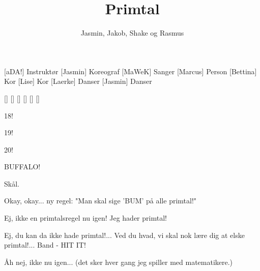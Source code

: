 \documentclass[a4paper,11pt]{article}
\title{Primtal}
\author{Jasmin, Jakob, Shake og Rasmus}
\begin{document}
\maketitle

\begin{roles}
[aDA!] Instruktør
[Jasmin] Koreograf
[MaWeK] Sanger
[Marcus] Person
[Bettina] Kor
[Lise] Kor
[Laerke] Danser
[Jasmin] Danser
\end{roles}

\begin{props}
[]
[]
[]
[]
[]
[]
\end{props}

\begin{sketch}

 18!

 19!

 20!

 BUFFALO!

 Skål.


 Okay, okay... ny regel: "Man skal sige 'BUM' på alle primtal!"

 Ej, ikke en primtalsregel nu igen! Jeg hader primtal!


 Ej, du kan da ikke hade primtal!... Ved du hvad, vi skal nok lære dig at elske primtal!... Band - HIT IT!


 Åh nej, ikke nu igen... (det sker hver gang jeg spiller med matematikere.)
\end{sketch}
\end{document}
